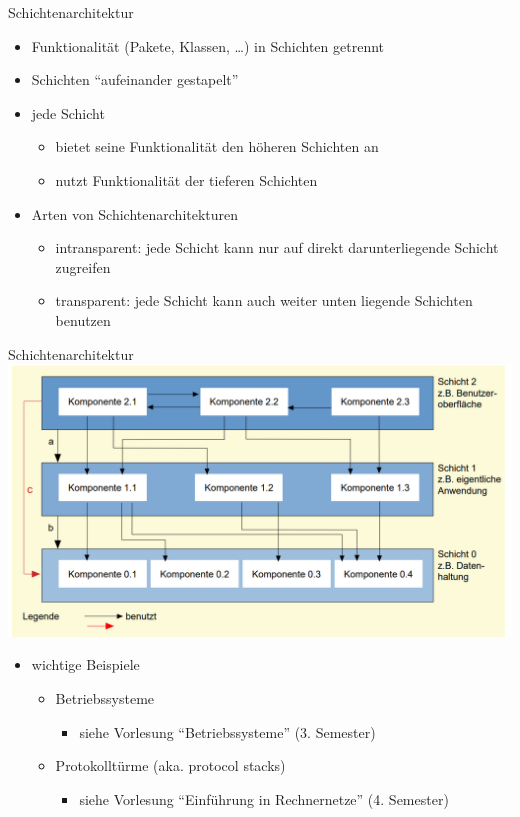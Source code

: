 \documentclass[18pt]{beamer}
\begin{document}
	\begin{frame}{Schichtenarchitektur}
	\begin{itemize}
		\item Funktionalität (Pakete, Klassen, \dots) in Schichten getrennt
		\item Schichten \enquote{aufeinander gestapelt}
		\item jede Schicht
		\begin{itemize}
			\item bietet seine Funktionalität den höheren Schichten an
			\item nutzt Funktionalität der tieferen Schichten
		\end{itemize}
		\item Arten von Schichtenarchitekturen
		\begin{itemize}
			\item intransparent: jede Schicht kann nur auf direkt darunterliegende Schicht zugreifen
			\item transparent: jede Schicht kann auch weiter unten liegende Schichten benutzen
		\end{itemize}
	\end{itemize}
	\end{frame}

\begin{frame}{Schichtenarchitektur}
	\centering \includegraphics[scale=0.3]{pics/tut3/layers.png}
	\begin{itemize}
		\item wichtige Beispiele
		\begin{itemize}
			\item Betriebssysteme
			\begin{itemize}
				\item siehe Vorlesung \enquote{Betriebssysteme} (3. Semester)
			\end{itemize}
			\item Protokolltürme (aka. protocol stacks) 
			\begin{itemize}
				\item siehe Vorlesung \enquote{Einführung in Rechnernetze} (4. Semester)
			\end{itemize}
		\end{itemize}
	\end{itemize}
\end{frame}
\end{document}
